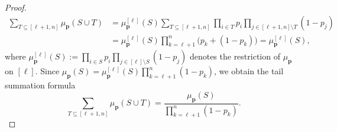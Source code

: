 \documentclass[11pt]{article}
\begin{document}
\begin{proof}
\begin{align*}
\sum_{T \subseteq [\ell+1,n]} \mu_{\mathbf{p}}(S \cup T)
&=
\mu_{\mathbf{p}}^{[\ell]}(S) 
\sum_{T \subseteq [\ell+1,n]} 
\prod_{i \in T} p_i \prod_{j \in [\ell+1,n] \setminus T} (1-p_j) \\
&=
\mu_{\mathbf{p}}^{[\ell]}(S) 
\prod_{k=\ell+1}^n \big( p_k + (1-p_k) \big) =
\mu_{\mathbf{p}}^{[\ell]}(S),
\end{align*}
where $\mu_{\mathbf{p}}^{[\ell]}(S) := \prod_{i \in S} p_i \prod_{j \in [\ell]\setminus S} (1-p_j)$ denotes the restriction of $\mu_{\mathbf{p}}$ on $[\ell]$. Since $\mu_{\mathbf{p}}(S) = \mu_{\mathbf{p}}^{[\ell]}(S) \prod_{k=\ell+1}^n (1-p_k)$, we obtain the tail summation formula
\begin{equation}
\sum_{T \subseteq [\ell+1,n]} \mu_{\mathbf{p}}(S \cup T)
=
\frac{\mu_{\mathbf{p}}(S)}{\prod_{k=\ell+1}^n (1-p_k)}. \label{f3}
\end{equation}


\end{proof}
\end{document}
